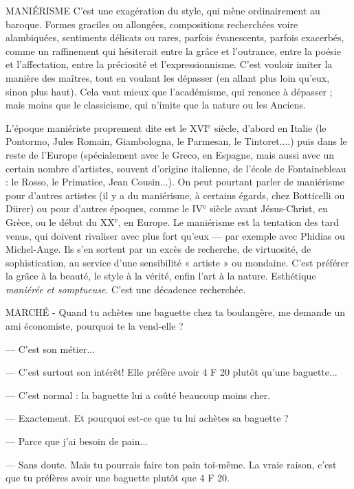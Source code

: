 MANIÉRISME C'est une exagération du style, qui mène ordinairement au
baroque. Formes graciles ou allongées, compositions recherchées
voire alambiquées, sentiments délicats ou rares, parfois évanescents, parfois
exacerbés, comme un raffinement qui hésiterait entre la grâce et l’outrance,
entre la poésie et l’affectation, entre la préciosité et l’expressionnisme. C’est
vouloir imiter la manière des maîtres, tout en voulant les dépasser (en allant
plus loin qu’eux, sinon plus haut). Cela vaut mieux que l’académisme, qui
renonce à dépasser ; mais moins que le classicisme, qui n’imite que la nature ou
les Anciens.

L'époque maniériste proprement dite est le {\footnotesize XVI$^\text{e}$} siècle, d’abord en Italie (le
Pontormo, Jules Romain, Giambologna, le Parmesan, le Tintoret....) puis dans
le reste de l'Europe (spécialement avec le Greco, en Espagne, mais aussi avec un
certain nombre d'artistes, souvent d’origine italienne, de l’école de
Fontainebleau : le Rosso, le Primatice, Jean Cousin...). On peut pourtant
parler de maniérisme pour d’autres artistes (il y a du maniérisme, à certains
égards, chez Botticelli ou Dürer) ou pour d’autres époques, comme le {\footnotesize IV$^\text{e}$} siècle
avant Jésus-Christ, en Grèce, ou le début du {\footnotesize XX$^\text{e}$}, en Europe. Le maniérisme est
la tentation des tard venus, qui doivent rivaliser avec plus fort qu'eux — par
exemple avec Phidias ou Michel-Ange. Ils s’en sortent par un excès de
recherche, de virtuosité, de sophistication, au service d’une sensibilité « artiste »
ou mondaine. C’est préférer la grâce à la beauté, le style à la vérité, enfin l’art à
la nature. Esthétique {\it maniérée et somptueuse}. C’est une décadence recherchée.

MARCHÉ - Quand tu achètes une baguette chez ta boulangère, me
demande un ami économiste, pourquoi te la vend-elle ?

— C’est son métier...

— C’est surtout son intérêt! Elle préfère avoir 4 F 20 plutôt qu’une
baguette...

— C’est normal : la baguette lui a coûté beaucoup moins cher.

— Exactement. Et pourquoi est-ce que tu lui achètes sa baguette ?

— Parce que j’ai besoin de pain...

— Sans doute. Mais tu pourrais faire ton pain toi-même. La vraie raison,
c’est que tu préfères avoir une baguette plutôt que 4 F 20.

